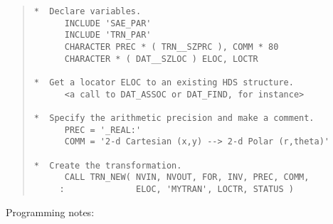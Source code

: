\documentclass[twoside,11pt]{article}
\newcommand{\numcir}[1]{\mbox{\hspace{3ex}\fbox{#1}}}
\begin{document}
\begin{quote}
\begin{tabbing} %

\verb#*  Declare variables.                                  #\\
\verb#      INCLUDE 'SAE_PAR'                                #\\
\verb#      INCLUDE 'TRN_PAR'                                #\numcir{1}\\
\verb#      CHARACTER PREC * ( TRN__SZPRC ), COMM * 80       #\\
\verb#      CHARACTER * ( DAT__SZLOC ) ELOC, LOCTR           #\\
\verb#                                                       #\\
\verb#*  Get a locator ELOC to an existing HDS structure.    #\\
\verb#      <a call to DAT_ASSOC or DAT_FIND, for instance>  #\\
\verb#                                                       #\\
\verb#*  Specify the arithmetic precision and make a comment.#\\
\verb#      PREC = '_REAL:'                                  #\numcir{2}\\
\verb#      COMM = '2-d Cartesian (x,y) --> 2-d Polar (r,theta)'#\numcir{3}\\
\verb#                                                       #\\
\verb#*  Create the transformation.                          #\\
\verb#      CALL TRN_NEW( NVIN, NVOUT, FOR, INV, PREC, COMM, #\numcir{4}\numcir{5}\\
\verb#     :              ELOC, 'MYTRAN', LOCTR, STATUS )    #

\end{tabbing}
\end{quote}

Programming notes:
\end{document}
